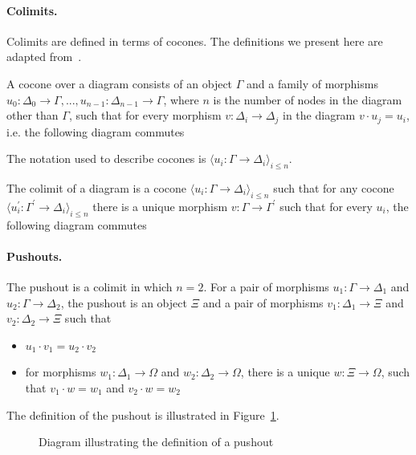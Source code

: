 \paragraph{Colimits.}
Colimits are defined in terms of cocones. The definitions we present here are adapted from~\cite{sannella2012foundations}. 

A cocone over a diagram consists of an object $\Gamma$ and a family of morphisms $u_0 : \Delta_0 \to \Gamma, ..., u_{n-1} : \Delta_{n-1} \to \Gamma$, where $n$ is the number of nodes in the diagram other than $\Gamma$, such that for every morphism $v : \Delta_i \to \Delta_j$ in the diagram $v \cdot u_j = u_i$, i.e. the following diagram commutes 
The notation used to describe cocones is 
$\langle u_i : \Gamma \to \Delta_i \rangle_{i\leq n}$.

The colimit of a diagram is a cocone  
$\langle u_i : \Gamma \to \Delta_i \rangle_{i\leq n}$ such that for any cocone 
$\langle u_i^{\prime} : \Gamma^{\prime} \to \Delta_i \rangle_{i\leq n}$ there is a unique morphism $v : \Gamma \to \Gamma^\prime$ such that for every $u_i$, the following diagram commutes 

\paragraph{Pushouts.}
The pushout is a colimit in which $n = 2$. For a pair of morphisms $u_1 : \Gamma \to \Delta_1$ and $u_2 : \Gamma \to \Delta_2$, the pushout is an object $\Xi$ and a pair of morphisms $v_1 : \Delta_1 \to \Xi$ and $v_2 : \Delta_2 \to \Xi$ such that 
\begin{itemize}
\item $u_1 \cdot v_1 = u_2 \cdot v_2 $
\item for morphisms $w_1 : \Delta_1 \to \Omega$ and $w_2 : \Delta_2 \to \Omega$, there is a unique $w : \Xi \to \Omega$, such that 
$v_1 \cdot w = w_1$ and $v_2 \cdot w = w_2$
\end{itemize}
The definition of the pushout is illustrated in Figure~\ref{fig:pushoutDef}. 
\begin{figure}
\caption{Diagram illustrating the definition of a pushout}
\label{fig:pushoutDef}
\end{figure}

